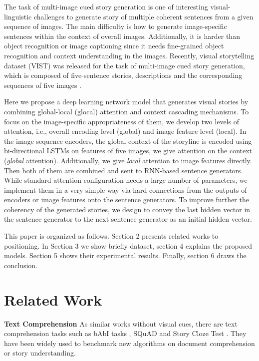 \documentclass[11pt,a4paper]{article}
\begin{document}
The task of multi-image cued story generation is one of interesting visual-linguistic challenges to generate story of multiple coherent sentences from a given sequence of images.
The main difficulty is how to generate image-specific sentences within the context of overall images. 
Additionally, it is harder than object recognition or image captioning since it needs fine-grained object recognition and context understanding in the images.
Recently, visual storytelling dataset (VIST) was released for the task of multi-image cued story generation, which is composed of five-sentence stories, descriptions and the corresponding sequences of five images \cite{huang2016visual}.


Here we propose a deep learning network model that generates visual stories by combining global-local (glocal) attention and context cascading mechanisms. 
To focus on the image-specific appropriateness of them, we develop two levels of attention, i.e., overall encoding level (global) and image feature level (local).
In the image sequence encoders, the global context of the storyline is encoded using bi-directional LSTMs on features of five images, we give attention on the context (\textit{global} attention).
Additionally, we give \textit{local} attention to image features directly. 
Then both of them are combined and sent to RNN-based sentence generators.
While standard attention configuration needs a large number of parameters, we implement them in a very simple way via hard connections from the outputs of encoders or image features onto the sentence generators.
To improve further the coherency of the generated stories, we design to convey the last hidden vector in the sentence generator to the next sentence generator as an initial hidden vector.




This paper is organized as follows. 
Section 2 presents related works to positioning. 
In Section 3 we show briefly dataset, section 4 explains the proposed models.
Section 5 shows their experimental results.
Finally, section 6 draws the conclusion.

\section{Related Work}
\textbf{Text Comprehension}  As similar works without visual cues, there are text comprehension tasks such as bAbI tasks \cite{weston2015babi}, SQuAD \cite{pranav2016squad} and Story Cloze Test \cite{nasrin2016clozetest}.
They have been widely used to benchmark new algorithms on document comprehension or story understanding.
\end{document}
